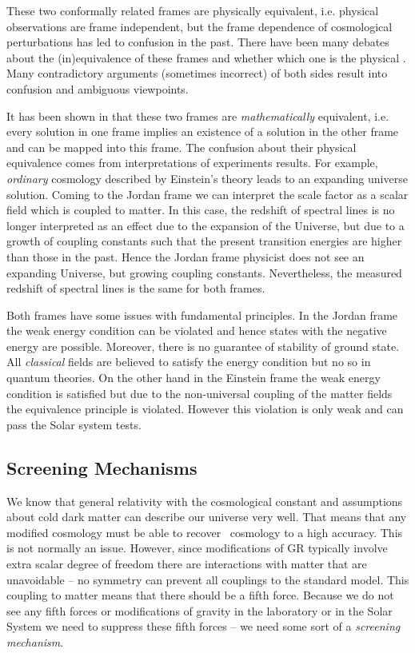 These two conformally related frames are physically equivalent, i.e. physical observations are frame independent, but the frame dependence of cosmological perturbations has led to confusion in the past. There have been many debates about the (in)equivalence of these frames \parencite{Postma:2014vaa} and whether which one is the physical \parencite{Faraoni:1999hp}. Many contradictory arguments (sometimes incorrect) of both sides result into confusion and ambiguous viewpoints.

It has been shown in \textcite{Magnano:1993bd} that these two frames are \textit{mathematically} equivalent, i.e. every solution in one frame implies an existence of a solution in the other frame and can be mapped into this frame. The confusion about their physical equivalence comes from interpretations of experiments results. For example, \textit{ordinary} cosmology described by Einstein’s theory leads to an expanding universe solution. Coming to the Jordan frame we can interpret the scale factor as a scalar field which is coupled to matter. In this case, the redshift of spectral lines is no longer interpreted as an effect due to the expansion of the Universe, but due to a growth of coupling constants such that the present transition energies are higher than those in the past. Hence the Jordan frame physicist does not see an expanding Universe, but growing coupling constants. Nevertheless, the measured redshift of spectral lines is the same for both frames.

Both frames have some issues with fundamental principles. In the Jordan frame the weak energy condition can be violated and hence states with the negative energy are possible. Moreover, there is no guarantee of stability of ground state. All \textit{classical} fields are believed to satisfy the energy condition but no so in quantum theories. On the other hand in the Einstein frame the weak energy condition is satisfied but due to the non-universal coupling of the matter fields the equivalence principle is violated. However this violation is only weak and can pass the Solar system tests.

\subsection{Screening Mechanisms}
We know that general relativity with the cosmological constant and assumptions about cold dark matter can describe our universe very well. That means that any modified cosmology must be able to recover \LCDM\ cosmology to a high accuracy. This is not normally an issue. However, since modifications of GR typically involve extra scalar degree of freedom there are interactions with matter that are unavoidable -- no symmetry can prevent all couplings to the standard model. This coupling to matter means that there should be a fifth force. Because we do not see any fifth forces or modifications of gravity in the laboratory or in the Solar System we need to suppress these fifth forces -- we need some sort of a \textit{screening mechanism}.

